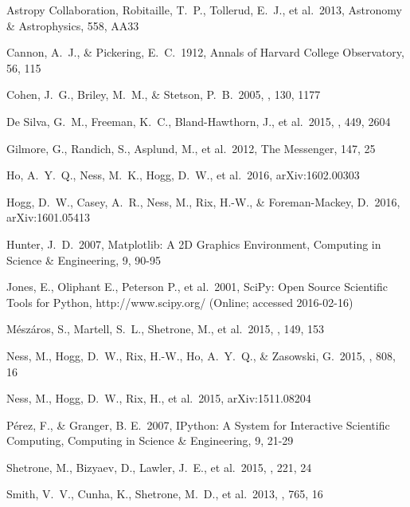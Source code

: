 \documentclass[12pt,preprint]{aastex}
\begin{document}
\begin{thebibliography}{dummy}\raggedright
{} Astropy Collaboration, Robitaille, T.~P., Tollerud, E.~J., et al.\ 2013, Astronomy \& Astrophysics, 558, AA33 

 Cannon, A.~J., \& Pickering, E.~C.\ 1912, Annals of Harvard College Observatory, 56, 115 

 Cohen, J.~G., Briley, 
M.~M., \& Stetson, P.~B.\ 2005, \aj, 130, 1177 

 De Silva, G.~M., 
Freeman, K.~C., Bland-Hawthorn, J., et al.\ 2015, \mnras, 449, 2604 

 Gilmore, G., Randich, 
S., Asplund, M., et al.\ 2012, The Messenger, 147, 25 

 Ho, A.~Y.~Q., Ness, M.~K., 
Hogg, D.~W., et al.\ 2016, arXiv:1602.00303 

 Hogg, D.~W., Casey, A.~R., 
Ness, M., Rix, H.-W., \& Foreman-Mackey, D.\ 2016, arXiv:1601.05413 

 Hunter, J.~D.\ 2007, Matplotlib: A 2D Graphics Environment, Computing in Science \& Engineering, 9, 90-95

 Jones, E., Oliphant E., Peterson P., et al.\ 2001, SciPy: Open Source Scientific Tools for Python, http://www.scipy.org/ (Online; accessed 2016-02-16)

M{\'e}sz{\'a}ros, S., Martell, S.~L., Shetrone, M., et al.\ 2015, \aj, 149, 
153 

 Ness, M., Hogg, D.~W., 
Rix, H.-W., Ho, A.~Y.~Q., \& Zasowski, G.\ 2015, \apj, 808, 16

 Ness, M., Hogg, D.~W., 
Rix, H., et al.\ 2015, arXiv:1511.08204 

 P\'erez, F., \& Granger, B. E.\ 2007, IPython: A System for Interactive Scientific Computing, Computing in Science \& Engineering, 9, 21-29

 Shetrone, M., Bizyaev, 
D., Lawler, J.~E., et al.\ 2015, \apjs, 221, 24 

 Smith, V.~V., Cunha, K., 
Shetrone, M.~D., et al.\ 2013, \apj, 765, 16 


\end{thebibliography}
\end{document}
